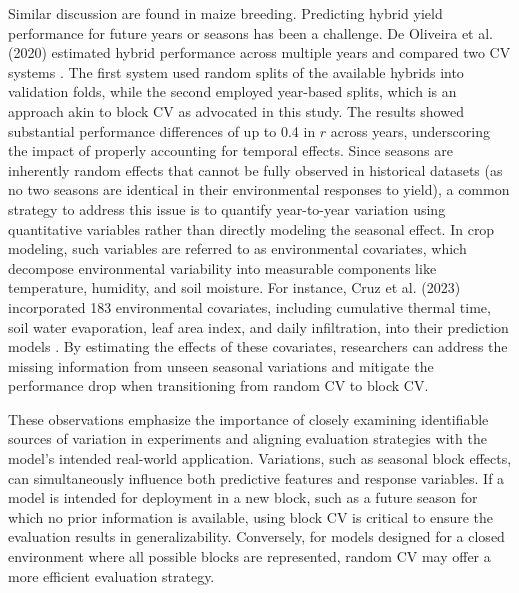 Similar discussion are found in maize breeding. Predicting hybrid yield performance for future years or seasons has been a challenge. De Oliveira et al. (2020) estimated hybrid performance across multiple years and compared two CV systems \citep{de_oliveira_genomic_2020}. The first system used random splits of the available hybrids into validation folds, while the second employed year-based splits, which is an approach akin to block CV as advocated in this study. The results showed substantial performance differences of up to 0.4 in $r$ across years, underscoring the impact of properly accounting for temporal effects. Since seasons are inherently random effects that cannot be fully observed in historical datasets (as no two seasons are identical in their environmental responses to yield), a common strategy to address this issue is to quantify year-to-year variation using quantitative variables rather than directly modeling the seasonal effect. In crop modeling, such variables are referred to as environmental covariates, which decompose environmental variability into measurable components like temperature, humidity, and soil moisture. For instance, Cruz et al. (2023) incorporated 183 environmental covariates, including cumulative thermal time, soil water evaporation, leaf area index, and daily infiltration, into their prediction models \citep{lopez-cruz_leveraging_2023}. By estimating the effects of these covariates, researchers can address the missing information from unseen seasonal variations and mitigate the performance drop when transitioning from random CV to block CV.

These observations emphasize the importance of closely examining identifiable sources of variation in experiments and aligning evaluation strategies with the model’s intended real-world application. Variations, such as seasonal block effects, can simultaneously influence both predictive features and response variables. If a model is intended for deployment in a new block, such as a future season for which no prior information is available, using block CV is critical to ensure the evaluation results in generalizability. Conversely, for models designed for a closed environment where all possible blocks are represented, random CV may offer a more efficient evaluation strategy.

